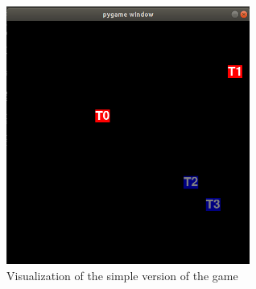 \begin{figure}[htp]
    \centering
    \includegraphics[width=8cm]{images/game_visual.png}
    \caption{Visualization of the simple version of the game}
    \label{fig:game_visual}
\end{figure}



